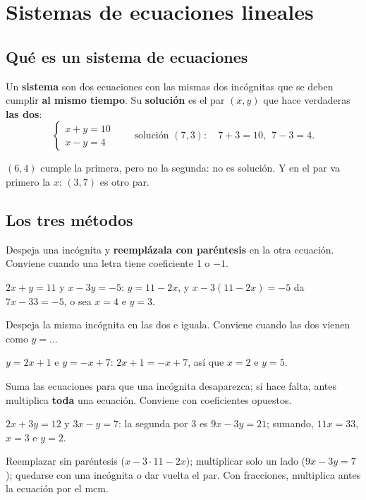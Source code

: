 \section{Sistemas de ecuaciones lineales}

\subsection{Qué es un sistema de ecuaciones}
Un \textbf{sistema} son dos ecuaciones con las mismas dos incógnitas que se deben cumplir \textbf{al mismo tiempo}. Su \textbf{solución} es el par $(x, y)$ que hace verdaderas \textbf{las dos}:
\[ \begin{cases} x + y = 10 \\ x - y = 4 \end{cases} \qquad\text{solución } (7, 3):\quad 7 + 3 = 10,\ \ 7 - 3 = 4. \]
\begin{ojo} $(6, 4)$ cumple la primera, pero no la segunda: no es solución. Y en el par va primero la $x$: $(3, 7)$ es otro par.\end{ojo}

\subsection{Los tres métodos}
\begin{clave}[Sustitución] Despeja una incógnita y \textbf{reemplázala con paréntesis} en la otra ecuación. Conviene cuando una letra tiene coeficiente 1 o $-1$.\end{clave}
\begin{ejemplo} $2x + y = 11$ y $x - 3y = -5$: $y = 11 - 2x$, y $x - 3(11 - 2x) = -5$ da $7x - 33 = -5$, o sea $x = 4$ e $y = 3$.\end{ejemplo}
\begin{clave}[Igualación] Despeja la misma incógnita en las dos e iguala. Conviene cuando las dos vienen como $y = \dots$\end{clave}
\begin{ejemplo} $y = 2x + 1$ e $y = -x + 7$: $2x + 1 = -x + 7$, así que $x = 2$ e $y = 5$.\end{ejemplo}
\begin{clave}[Reducción] Suma las ecuaciones para que una incógnita desaparezca; si hace falta, antes multiplica \textbf{toda} una ecuación. Conviene con coeficientes opuestos.\end{clave}
\begin{ejemplo} $2x + 3y = 12$ y $3x - y = 7$: la segunda por 3 es $9x - 3y = 21$; sumando, $11x = 33$, $x = 3$ e $y = 2$.\end{ejemplo}
\begin{ojo} Reemplazar sin paréntesis ($x - 3\cdot 11 - 2x$); multiplicar solo un lado ($9x - 3y = 7$); quedarse con una incógnita o dar vuelta el par. Con fracciones, multiplica antes la ecuación por el mcm.\end{ojo}

